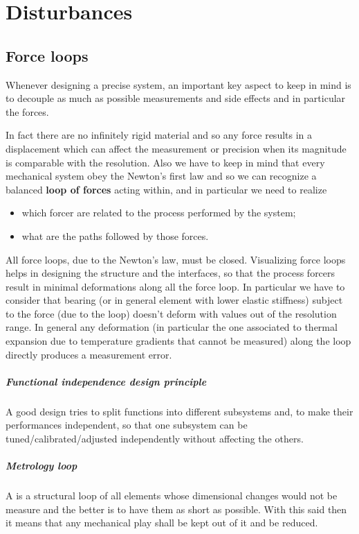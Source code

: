 \chapter{Disturbances}
\section{Force loops}
	
	Whenever designing a precise system, an important key aspect to keep in mind is to decouple as much as possible measurements and side effects and in particular the forces.
	
	In fact there are no infinitely rigid material and so any force results in a displacement which can affect the measurement or precision when its magnitude is comparable with the resolution. Also we have to keep in mind that every mechanical system obey the Newton's first law and so we can recognize a balanced \textbf{loop of forces} acting within, and in particular we need to realize
	\begin{itemize}
		\item which forcer are related to the process performed by the system;
		\item what are the paths followed by those forces.
	\end{itemize}
	All force loops, due to the Newton's law, must be closed. Visualizing force loops helps in designing the structure and the interfaces, so that the process forcers  result in minimal deformations along all the force loop. In particular we have to consider that bearing (or in general element with lower elastic stiffness) subject to the force (due to the loop) doesn't deform with values out of the resolution range. In  general any deformation (in particular the one associated to thermal expansion due to temperature gradients that cannot be measured) along the loop directly produces a measurement error.
	
	\paragraph{Functional independence design principle} A good design tries to split functions into different subsystems and, to make their performances independent, so that one subsystem can be tuned/calibrated/adjusted independently without affecting the others.
	
	\paragraph{Metrology loop} A  is a structural loop of all elements whose dimensional changes would not be measure and the better is to have them as short as possible. With this said then it means that any mechanical play shall be kept out of it and be reduced.
	
